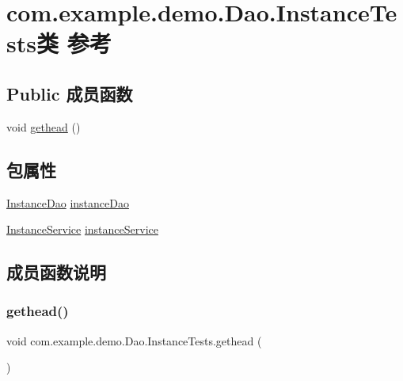 \hypertarget{classcom_1_1example_1_1demo_1_1_dao_1_1_instance_tests}{}\section{com.\+example.\+demo.\+Dao.\+Instance\+Tests类 参考}
\label{classcom_1_1example_1_1demo_1_1_dao_1_1_instance_tests}
\subsection*{Public 成员函数}
\begin{DoxyCompactItemize}
\item 
void \mbox{\hyperlink{classcom_1_1example_1_1demo_1_1_dao_1_1_instance_tests_a1193098b447622fa61c165d7c492e56e}{gethead}} ()
\end{DoxyCompactItemize}
\subsection*{包属性}
\begin{DoxyCompactItemize}
\item 
\mbox{\hyperlink{interfacecom_1_1example_1_1demo_1_1dao_1_1_instance_dao}{Instance\+Dao}} \mbox{\hyperlink{classcom_1_1example_1_1demo_1_1_dao_1_1_instance_tests_a2cf69ddf603f6703052fd7c397d6514d}{instance\+Dao}}
\item 
\mbox{\hyperlink{classcom_1_1example_1_1demo_1_1service_1_1_instance_service}{Instance\+Service}} \mbox{\hyperlink{classcom_1_1example_1_1demo_1_1_dao_1_1_instance_tests_a96a6b099ba33ed8eb8b747edb7885ed5}{instance\+Service}}
\end{DoxyCompactItemize}


\subsection{成员函数说明}
\mbox{\label{classcom_1_1example_1_1demo_1_1_dao_1_1_instance_tests_a1193098b447622fa61c165d7c492e56e}} 
\subsubsection{\texorpdfstring{gethead()}{gethead()}}
{\footnotesize\ttfamily void com.\+example.\+demo.\+Dao.\+Instance\+Tests.\+gethead (\begin{DoxyParamCaption}{ }\end{DoxyParamCaption})}



